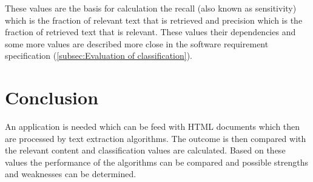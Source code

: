 These values are the basis for calculation the recall (also known as sensitivity) which is the fraction of relevant text that is retrieved and precision which is the fraction of retrieved text that is relevant. These values their dependencies and some more values are described more close in the software requirement specification (\ref{subsec:Evaluation of classification}).

\section{Conclusion}

An application is needed which can be feed with HTML documents which then are processed by text extraction algorithms. The outcome is then compared with the relevant content and classification values are calculated. Based on these values the performance of the algorithms can be compared and possible strengths and weaknesses  can be determined.


